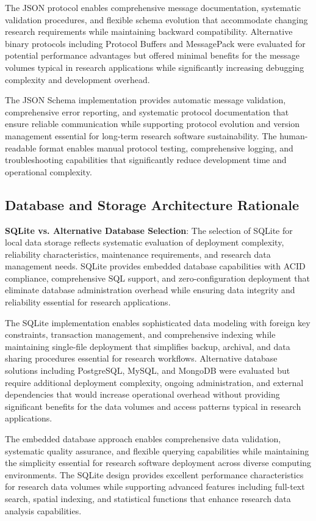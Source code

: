 \documentclass[11pt,a4paper]{report}
\begin{document}
The JSON protocol enables comprehensive message documentation, systematic validation procedures, and flexible schema evolution that accommodate changing research requirements while maintaining backward compatibility. Alternative binary protocols including Protocol Buffers and MessagePack were evaluated for potential performance advantages but offered minimal benefits for the message volumes typical in research applications while significantly increasing debugging complexity and development overhead.

The JSON Schema implementation provides automatic message validation, comprehensive error reporting, and systematic protocol documentation that ensure reliable communication while supporting protocol evolution and version management essential for long-term research software sustainability. The human-readable format enables manual protocol testing, comprehensive logging, and troubleshooting capabilities that significantly reduce development time and operational complexity.

\subsection{Database and Storage Architecture Rationale}

\noindent \textbf{SQLite vs. Alternative Database Selection}: The selection of SQLite for local data storage reflects systematic evaluation of deployment complexity, reliability characteristics, maintenance requirements, and research data management needs. SQLite provides embedded database capabilities with ACID compliance, comprehensive SQL support, and zero-configuration deployment that eliminate database administration overhead while ensuring data integrity and reliability essential for research applications.

The SQLite implementation enables sophisticated data modeling with foreign key constraints, transaction management, and comprehensive indexing while maintaining single-file deployment that simplifies backup, archival, and data sharing procedures essential for research workflows. Alternative database solutions including PostgreSQL, MySQL, and MongoDB were evaluated but require additional deployment complexity, ongoing administration, and external dependencies that would increase operational overhead without providing significant benefits for the data volumes and access patterns typical in research applications.

The embedded database approach enables comprehensive data validation, systematic quality assurance, and flexible querying capabilities while maintaining the simplicity essential for research software deployment across diverse computing environments. The SQLite design provides excellent performance characteristics for research data volumes while supporting advanced features including full-text search, spatial indexing, and statistical functions that enhance research data analysis capabilities.
\end{document}
